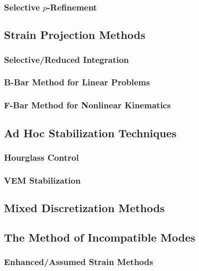 \subsubsection{Selective $p$-Refinement}

\subsection{Strain Projection Methods}
\subsubsection{Selective/Reduced Integration}
\subsubsection{B-Bar Method for Linear Problems}
\subsubsection{F-Bar Method for Nonlinear Kinematics}

\subsection{Ad Hoc Stabilization Techniques}
\subsubsection{Hourglass Control}
\subsubsection{VEM Stabilization}

\subsection{Mixed Discretization Methods}

\subsection{The Method of Incompatible Modes}
\subsubsection{Enhanced/Assumed Strain Methods}
